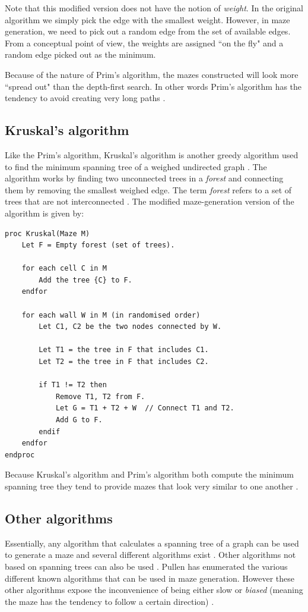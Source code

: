 Note that this modified version does not have the notion of {\em weight}. In the original algorithm we simply pick the edge with the smallest weight. However, in maze generation, we need to pick out a random edge from the set of available edges. From a conceptual point of view, the weights are assigned ``on the fly" and a random edge picked out as the minimum. 

Because of the nature of Prim's algorithm, the mazes constructed will look more ``spread out" than the depth-first search. In other words Prim's algorithm has the tendency to avoid creating very long paths \citep{ThinkLabyrinth}.

\subsection{Kruskal's algorithm}
Like the Prim's algorithm, Kruskal's algorithm is another greedy algorithm used to find the minimum spanning tree of a weighed undirected graph \citep{Kruskal}. The algorithm works by finding two unconnected trees in a {\em forest} and connecting them by removing the smallest weighed edge. The term {\em forest} refers to a set of trees that are not interconnected \citep{DSAJ-4}. The modified maze-generation version of the algorithm is given by:

\lstAlgo
\begin{lstlisting}
proc Kruskal(Maze M)
	Let F = Empty forest (set of trees).
	
	for each cell C in M
		Add the tree {C} to F.
	endfor
	
	for each wall W in M (in randomised order)
		Let C1, C2 be the two nodes connected by W.
	
		Let T1 = the tree in F that includes C1.
		Let T2 = the tree in F that includes C2.
		
		if T1 != T2 then
			Remove T1, T2 from F.
			Let G = T1 + T2 + W  // Connect T1 and T2.
			Add G to F.
		endif
	endfor
endproc
\end{lstlisting}

Because Kruskal's algorithm and Prim's algorithm both compute the minimum spanning tree they tend to provide mazes that look very similar to one another \citep{DSAJ-4}.

\subsection{Other algorithms}
Essentially, any algorithm that calculates a spanning tree of a graph can be used to generate a maze and several different algorithms exist \citep{AAJarai}. Other algorithms not based on spanning trees can also be used \citep{ThinkLabyrinth}. Pullen has enumerated the various different known algorithms that can be used in maze generation. However these other algorithms expose the inconvenience of being either slow or {\em biased} (meaning the maze has the tendency to follow a certain direction) \citep{ThinkLabyrinth}. 

